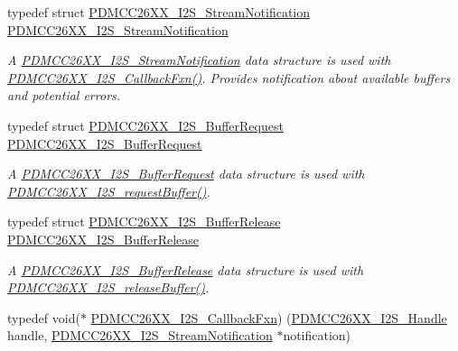 \begin{DoxyCompactItemize}
typedef struct \hyperlink{struct_p_d_m_c_c26_x_x___i2_s___stream_notification}{P\+D\+M\+C\+C26\+X\+X\+\_\+\+I2\+S\+\_\+\+Stream\+Notification} \hyperlink{_p_d_m_c_c26_x_x__util_8h_ac2e036836381051508576dc3bb2fe78c}{P\+D\+M\+C\+C26\+X\+X\+\_\+\+I2\+S\+\_\+\+Stream\+Notification}
\begin{DoxyCompactList}\small\item\em A \hyperlink{struct_p_d_m_c_c26_x_x___i2_s___stream_notification}{P\+D\+M\+C\+C26\+X\+X\+\_\+\+I2\+S\+\_\+\+Stream\+Notification} data structure is used with \hyperlink{_p_d_m_c_c26_x_x__util_8h_a82786f08d1b22895c79dcd8880fb92f3}{P\+D\+M\+C\+C26\+X\+X\+\_\+\+I2\+S\+\_\+\+Callback\+Fxn()}. Provides notification about available buffers and potential errors. \end{DoxyCompactList}\item 
typedef struct \hyperlink{struct_p_d_m_c_c26_x_x___i2_s___buffer_request}{P\+D\+M\+C\+C26\+X\+X\+\_\+\+I2\+S\+\_\+\+Buffer\+Request} \hyperlink{_p_d_m_c_c26_x_x__util_8h_ad0118de2c13236f0d75f7b5279c0b72a}{P\+D\+M\+C\+C26\+X\+X\+\_\+\+I2\+S\+\_\+\+Buffer\+Request}
\begin{DoxyCompactList}\small\item\em A \hyperlink{struct_p_d_m_c_c26_x_x___i2_s___buffer_request}{P\+D\+M\+C\+C26\+X\+X\+\_\+\+I2\+S\+\_\+\+Buffer\+Request} data structure is used with \hyperlink{_p_d_m_c_c26_x_x__util_8h_a69561b9a6f07a82bfe3b18f3c51fcd19}{P\+D\+M\+C\+C26\+X\+X\+\_\+\+I2\+S\+\_\+request\+Buffer()}. \end{DoxyCompactList}\item 
typedef struct \hyperlink{struct_p_d_m_c_c26_x_x___i2_s___buffer_release}{P\+D\+M\+C\+C26\+X\+X\+\_\+\+I2\+S\+\_\+\+Buffer\+Release} \hyperlink{_p_d_m_c_c26_x_x__util_8h_ab2a6fc7ef5e6cf67ee2686e4d6553ea4}{P\+D\+M\+C\+C26\+X\+X\+\_\+\+I2\+S\+\_\+\+Buffer\+Release}
\begin{DoxyCompactList}\small\item\em A \hyperlink{struct_p_d_m_c_c26_x_x___i2_s___buffer_release}{P\+D\+M\+C\+C26\+X\+X\+\_\+\+I2\+S\+\_\+\+Buffer\+Release} data structure is used with \hyperlink{_p_d_m_c_c26_x_x__util_8h_ae6436840c3944258d3bdf041250dd10c}{P\+D\+M\+C\+C26\+X\+X\+\_\+\+I2\+S\+\_\+release\+Buffer()}. \end{DoxyCompactList}\item 
typedef void($\ast$ \hyperlink{_p_d_m_c_c26_x_x__util_8h_a82786f08d1b22895c79dcd8880fb92f3}{P\+D\+M\+C\+C26\+X\+X\+\_\+\+I2\+S\+\_\+\+Callback\+Fxn}) (\hyperlink{_p_d_m_c_c26_x_x__util_8h_adc3b274b4a54e54316ad385fd4290c80}{P\+D\+M\+C\+C26\+X\+X\+\_\+\+I2\+S\+\_\+\+Handle} handle, \hyperlink{struct_p_d_m_c_c26_x_x___i2_s___stream_notification}{P\+D\+M\+C\+C26\+X\+X\+\_\+\+I2\+S\+\_\+\+Stream\+Notification} $\ast$notification)

\end{DoxyCompactItemize}

